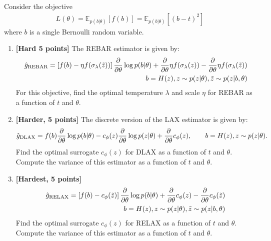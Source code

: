 \documentclass{harvardml}
\newcommand{\E}{\mathbb{E}}
\newcommand{\PT}{\frac{\partial}{\partial \theta}}
\newcommand{\LAX}{{\textnormal{LAX}}}
\newcommand{\DLAX}{{\textnormal{DLAX}}}
\theoremstyle{plain}
\begin{document}









\begin{problem}

Consider the objective
%
\begin{align}
L(\theta) 
= \E_{p(b|\theta)} \left[ f(b) \right]
= \E_{p(b|\theta)} \left[ (b - t)^2 \right]
\end{align}
%
where $b$ is a single Bernoulli random variable.


\begin{enumerate}[label=(\alph*)]
\item {\bf [Hard 5 points]} The REBAR estimator is given by:
\begin{align}
\hat g_\textnormal{REBAR} = \left[ f(b) - \eta f(\sigma_\lambda(\tilde{z})) \right] \PT \log p(b|\theta) + \PT \eta f(\sigma_\lambda(z)) - \PT \eta f(\sigma_\lambda(\tilde{z})) \\
\qquad b = H(z), z \sim p(z|\theta), \tilde{z} \sim p(z|b, \theta) \nonumber
\end{align}
%
For this objective, find the optimal temperature $\lambda$ and scale $\eta$ for REBAR as a function of $t$ and $\theta$.
\item {\bf [Harder, 5 points]} The discrete version of the \LAX{} estimator is given by:
%
\begin{align}
\label{eq:discrete lax}
\hat g_\DLAX = f(b) \PT \log p(b|\theta) - c_\phi(z) \PT \log p(z|\theta) + \PT c_\phi(z), \qquad b = H(z), z \sim p(z|\theta).
\end{align}
%
Find the optimal surrogate $c_\phi(z)$ for DLAX as a function of $t$ and $\theta$.
Compute the variance of this estimator as a function of $t$ and $\theta$.
\item {\bf [Hardest, 5 points]} %
\begin{align}
\hat g_\textnormal{RELAX} = \left[ f(b) - c_\phi(\tilde{z}) \right] \PT \log p(b|\theta) + \PT c_\phi(z) - \PT c_\phi (\tilde{z}) \\
\qquad b = H(z), z \sim p(z|\theta), \tilde{z} \sim p(z|b, \theta) \nonumber
\end{align}
%
Find the optimal surrogate $c_\phi(z)$ for RELAX as a function of $t$ and $\theta$.
Compute the variance of this estimator as a function of $t$ and $\theta$.
\end{enumerate}
\end{problem}



\end{document}
